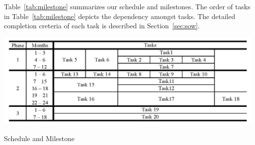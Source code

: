 Table~\ref{tab:milestone} summarizes our schedule and milestones.
The order of tasks in Table~\ref{tab:milestone} depicts the dependency amongst tasks.
The detailed completion creteria of each task is described in Section~\ref{sec:sow}.

\begin{table}[h]
\center
\includegraphics[width=1.0\linewidth]{fig/milestone.png}
\caption{Schedule and Milestone}
\label{tab:milestone}
\end{table}

